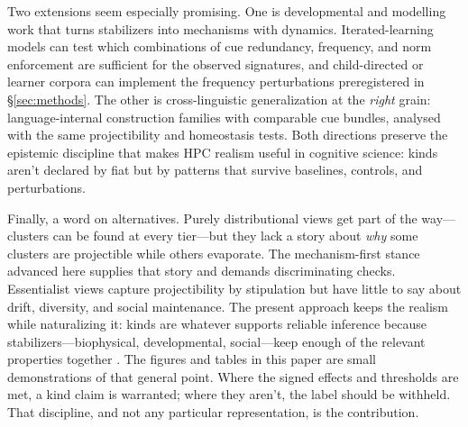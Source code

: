 \documentclass[12pt]{article}
\begin{document}
Two extensions seem especially promising. One is developmental and modelling work that turns stabilizers into mechanisms with dynamics. Iterated-learning models can test which combinations of cue redundancy, frequency, and norm enforcement are sufficient for the observed signatures, and child-directed or learner corpora can implement the frequency perturbations preregistered in \S\ref{sec:methods}. The other is cross-linguistic generalization at the \emph{right} grain: language-internal construction families with comparable cue bundles, analysed with the same projectibility and homeostasis tests. Both directions preserve the epistemic discipline that makes \textsc{HPC} realism useful in cognitive science: kinds aren't declared by fiat but by patterns that survive baselines, controls, and perturbations.

Finally, a word on alternatives. Purely distributional views get part of the way—clusters can be found at every tier—but they lack a story about \emph{why} some clusters are projectible while others evaporate. The mechanism-first stance advanced here supplies that story and demands discriminating checks. Essentialist views capture projectibility by stipulation but have little to say about drift, diversity, and social maintenance. The present approach keeps the realism while naturalizing it: kinds are whatever supports reliable inference because stabilizers—biophysical, developmental, social—keep enough of the relevant properties together \citep{Miller2021WordsSpeciesKinds,Boyd1991Enthusiasm,Boyd1999Homeostasis}. The figures and tables in this paper are small demonstrations of that general point. Where the signed effects and thresholds are met, a kind claim is warranted; where they aren't, the label should be withheld. That discipline, and not any particular representation, is the contribution.


\clearpage


\end{document}
